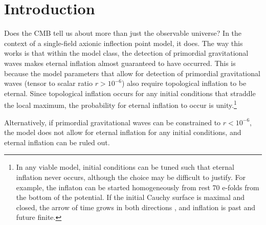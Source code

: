 \documentclass[aps,amsfonts,amsmath,prd,preprint,nofootinbib,superscriptaddress]{revtex4}
\begin{document}
\begin{abstract}
\end{abstract}

\maketitle
\tableofcontents




\section{Introduction}


Does the CMB tell us about more than just the observable universe?  In the context of a single-field axionic inflection point model, it does.  
The way this works is that within the model class, the detection of primordial gravitational waves makes eternal inflation almost
guaranteed to have occurred.  This is because the model parameters that allow for detection of primordial gravitational waves (tensor to scalar ratio $r > 10^{-6}$) 
also require topological inflation to be eternal.  Since topological inflation occurs for any initial conditions that straddle the local maximum, the probability
for eternal inflation to occur is unity.\footnote{In any viable model, initial conditions can be tuned such that eternal inflation never occurs, although the choice may be 
difficult to justify.  For example, the inflaton can be started homogeneously from rest 70 e-folds from the bottom
of the potential.  If the initial Cauchy surface is maximal and closed, the arrow of time grows in both directions \cite{Aguirre:2007gy}, and inflation is 
past and future finite.}


Alternatively, if primordial gravitational waves can be constrained to $r < 10^{-6}$, the model does not allow for eternal inflation for any initial conditions,
and eternal inflation can be ruled out.  
\end{document}
